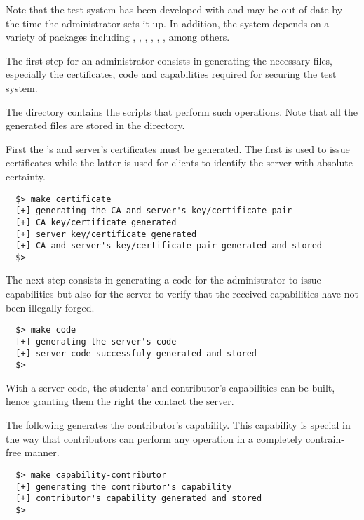 Note that the test system has been developed with  and
may be out of date by the time the administrator sets it up. In addition,
the system depends on a variety of  packages including
, , , , ,
,  among others.


The first step for an administrator consists in generating the necessary
files, especially the certificates, code and capabilities required for
securing the test system.

The  directory contains the scripts that perform
such operations. Note that all the generated files are stored in the
 directory.

First the 's and server's certificates
must be generated. The first is used to issue certificates while the latter
is used for clients to identify the server with absolute certainty.

\begin{verbatim}
  $> make certificate
  [+] generating the CA and server's key/certificate pair
  [+] CA key/certificate generated
  [+] server key/certificate generated
  [+] CA and server's key/certificate pair generated and stored
  $> 
\end{verbatim}

The next step consists in generating a code for the administrator to
issue capabilities but also for the server to verify that the received
capabilities have not been illegally forged.

\begin{verbatim}
  $> make code
  [+] generating the server's code
  [+] server code successfuly generated and stored
  $> 
\end{verbatim}

With a server code, the students' and contributor's capabilities can be
built, hence granting them the right the contact the server.

The following generates the contributor's capability. This capability is
special in the way that contributors can perform any operation in a completely
contrain-free manner.

\begin{verbatim}
  $> make capability-contributor
  [+] generating the contributor's capability
  [+] contributor's capability generated and stored
  $> 
\end{verbatim}

